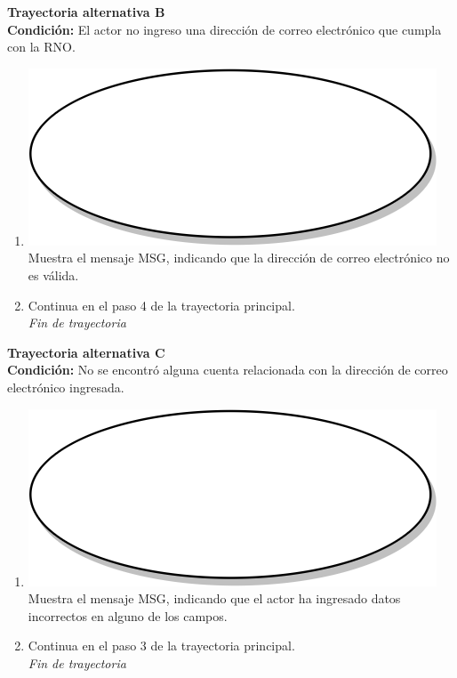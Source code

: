 \textbf{Trayectoria alternativa B} \label{cu1_1_ta_b}\\
\textbf{Condición:} El actor no ingreso una dirección de correo electrónico que cumpla con la RNO.\\
 \begin{enumerate}[label=B\arabic*]
    \item {\includegraphics[scale=.05]{Capitulo3/img/proceso.png} Muestra el mensaje MSG, indicando que la dirección de correo electrónico no es válida.}
    \item {Continua en el paso 4 de la trayectoria principal.} \\
    \textit{Fin de trayectoria} \\
\end{enumerate}

\textbf{Trayectoria alternativa C} \label{cu1_1_ta_c}\\
\textbf{Condición:} No se encontró alguna cuenta relacionada con la dirección de correo electrónico ingresada.\\
 \begin{enumerate}[label=C\arabic*]
    \item {\includegraphics[scale=.05]{Capitulo3/img/proceso.png} Muestra el mensaje MSG, indicando que el actor ha ingresado datos incorrectos en alguno de los campos.}
    \item {Continua en el paso 3 de la trayectoria principal.} \\
    \textit{Fin de trayectoria} \\
\end{enumerate}

